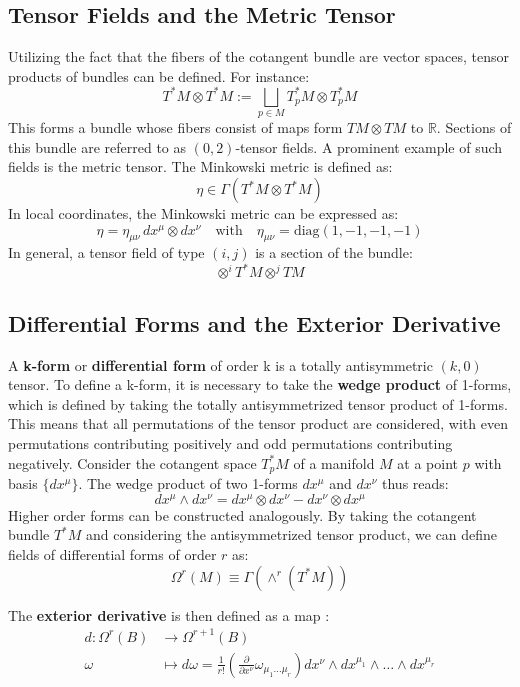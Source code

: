 \subsection{Tensor Fields and the Metric Tensor}

Utilizing the fact that the fibers of the cotangent bundle are vector spaces, tensor products of bundles can be defined. For instance:
\[
T^*M \otimes T^*M := \bigsqcup_{p \in M} T_p^*M \otimes T_p^*M
\]
This forms a bundle whose fibers consist of maps form $TM \otimes TM$ to $\mathbb{R}$. Sections of this bundle are referred to as \((0,2)\)-tensor fields. A prominent example of such fields is the metric tensor. The Minkowski metric is defined as:
\[
\eta \in \Gamma(T^*M \otimes T^*M)
\]
In local coordinates, the Minkowski metric can be expressed as:
\[
\eta = \eta_{\mu\nu} \, dx^\mu \otimes dx^\nu
\quad \text{with} \quad \eta_{\mu\nu} = \text{diag}(1, -1, -1, -1)
\]
In general, a tensor field of type $(i,j)$ is a section of the bundle\cite{NakaharaGeometrytopologyphysics2005}:
\[ \otimes^iT^*M \otimes^jTM \]


\subsection{Differential Forms and the Exterior Derivative}
A \textbf{k-form} or \textbf{differential form} of order k is a totally antisymmetric $(k,0)$ tensor. To define a k-form, it is necessary to take the \textbf{wedge product} of 1-forms, which is defined by taking the totally antisymmetrized tensor product of 1-forms. This means that all permutations of the tensor product are considered, with even permutations contributing positively and odd permutations contributing negatively. Consider the cotangent space $T_p^*M$ of a manifold $M$ at a point $p$ with basis $\{dx^\mu\}$. The wedge product of two 1-forms \(dx^\mu\) and \(dx^\nu\) thus reads:
\[
dx^\mu \wedge dx^\nu = dx^\mu \otimes dx^\nu - dx^\nu \otimes dx^\mu
\]
Higher order forms can be constructed analogously. By taking the cotangent bundle \(T^*M\) and considering the antisymmetrized tensor product, we can define fields of differential forms of order \(r\) as:
\[\Omega^r(M) \equiv \Gamma(\wedge^r (T^*M))\]

The \textbf{exterior derivative} is then defined as a map \cite{NakaharaGeometrytopologyphysics2005}:
\begin{align*}
  d: \Omega^r(B) &\to \Omega^{r+1}(B) \\
  \omega &\mapsto d\omega = \frac{1}{r!}\left( \frac{\partial}{ \partial x^\nu} \omega_{\mu_1 \dots \mu_r} \right) dx^\nu \wedge dx^{\mu_1} \wedge \dots \wedge dx^{\mu_r}
\end{align*}

